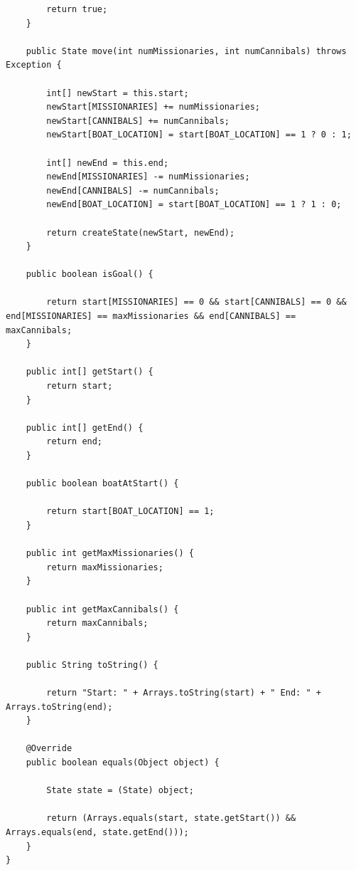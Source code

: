 \documentclass[11pt]{article}
\begin{document}
\begin{lstlisting}
		return true;
	}
	
	public State move(int numMissionaries, int numCannibals) throws Exception {		
		
		int[] newStart = this.start;
		newStart[MISSIONARIES] += numMissionaries;
		newStart[CANNIBALS] += numCannibals;
		newStart[BOAT_LOCATION] = start[BOAT_LOCATION] == 1 ? 0 : 1;
	
		int[] newEnd = this.end;
		newEnd[MISSIONARIES] -= numMissionaries;
		newEnd[CANNIBALS] -= numCannibals;
		newEnd[BOAT_LOCATION] = start[BOAT_LOCATION] == 1 ? 1 : 0;
		
		return createState(newStart, newEnd);
	}

	public boolean isGoal() {
		
		return start[MISSIONARIES] == 0 && start[CANNIBALS] == 0 && end[MISSIONARIES] == maxMissionaries && end[CANNIBALS] == maxCannibals;
	}
	
	public int[] getStart() {
		return start;
	}

	public int[] getEnd() {
		return end;
	}
	
	public boolean boatAtStart() {
		
		return start[BOAT_LOCATION] == 1;
	}
	
	public int getMaxMissionaries() {
		return maxMissionaries;
	}
	
	public int getMaxCannibals() {
		return maxCannibals;
	}
	
	public String toString() {
		
		return "Start: " + Arrays.toString(start) + " End: " + Arrays.toString(end);
	}
	
	@Override
    public boolean equals(Object object) {
		
		State state = (State) object;
		
		return (Arrays.equals(start, state.getStart()) && Arrays.equals(end, state.getEnd()));
    }
}
\end{lstlisting}
\end{document}
